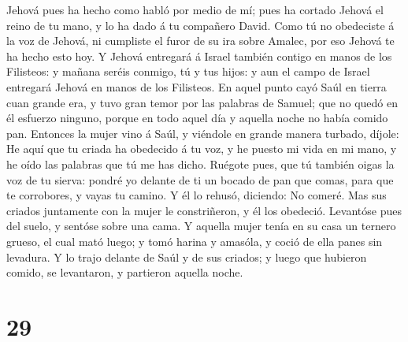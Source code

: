  Jehová pues ha hecho como habló por medio de mí; pues ha
cortado Jehová el reino de tu mano, y lo ha dado á tu compañero David.
 Como tú no obedeciste á la voz de Jehová, ni cumpliste el
furor de su ira sobre Amalec, por eso Jehová te ha hecho esto hoy.
 Y Jehová entregará á Israel también contigo en manos de
los Filisteos: y mañana seréis conmigo, tú y tus hijos: y aun el campo
de Israel entregará Jehová en manos de los Filisteos.  En
aquel punto cayó Saúl en tierra cuan grande era, y tuvo gran temor por
las palabras de Samuel; que no quedó en él esfuerzo ninguno, porque en
todo aquel día y aquella noche no había comido pan. 
Entonces la mujer vino á Saúl, y viéndole en grande manera turbado,
díjole: He aquí que tu criada ha obedecido á tu voz, y he puesto mi vida
en mi mano, y he oído las palabras que tú me has dicho. 
Ruégote pues, que tú también oigas la voz de tu sierva: pondré yo
delante de ti un bocado de pan que comas, para que te corrobores, y
vayas tu camino.  Y él lo rehusó, diciendo: No comeré. Mas
sus criados juntamente con la mujer le constriñeron, y él los obedeció.
Levantóse pues del suelo, y sentóse sobre una cama.  Y
aquella mujer tenía en su casa un ternero grueso, el cual mató luego; y
tomó harina y amasóla, y coció de ella panes sin levadura. 
Y lo trajo delante de Saúl y de sus criados; y luego que hubieron
comido, se levantaron, y partieron aquella noche.

\hypertarget{section-28}{%
\section{29}\label{section-28}}


